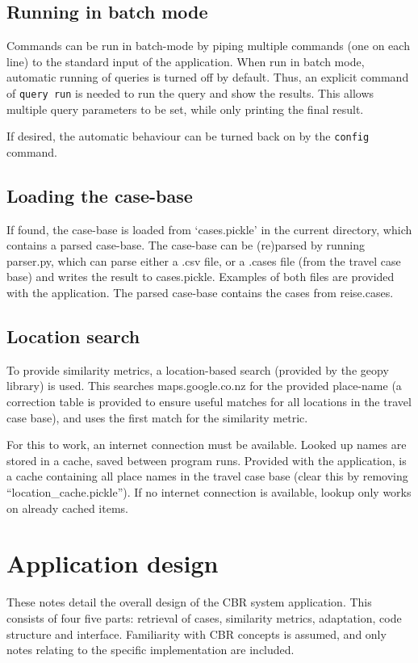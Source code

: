 \documentclass[11pt]{article}
\begin{document}
\subsection{Running in batch mode}
Commands can be run in batch-mode by piping multiple commands (one on
each line) to the standard input of the application. When run in batch
mode, automatic running of queries is turned off by default. Thus, an
explicit command of \verb~query run~ is needed to run the query and
show the results. This allows multiple query parameters to be set,
while only printing the final result.

If desired, the automatic behaviour can be turned back on by the
\verb~config~ command.

\subsection{Loading the case-base}
If found, the case-base is loaded from `cases.pickle' in the current
directory, which contains a parsed case-base. The case-base can be
(re)parsed by running parser.py, which can parse either a .csv file,
or a .cases file (from the travel case base) and writes the result to
cases.pickle. Examples of both files are provided with the
application. The parsed case-base contains the cases from reise.cases.

\subsection{Location search}
To provide similarity metrics, a location-based search (provided by
the geopy library) is used. This searches maps.google.co.nz for the
provided place-name (a correction table is provided to ensure useful
matches for all locations in the travel case base), and uses the first
match for the similarity metric.

For this to work, an internet connection must be available. Looked up
names are stored in a cache, saved between program runs. Provided with
the application, is a cache containing all place names in the travel
case base (clear this by removing ``location_cache.pickle''). If no
internet connection is available, lookup only works on already cached
items.

\section{Application design}
These notes detail the overall design of the CBR system application.
This consists of four five parts: retrieval of cases, similarity
metrics, adaptation, code structure and interface. Familiarity with
CBR concepts is assumed, and only notes relating to the specific
implementation are included.
\end{document}
